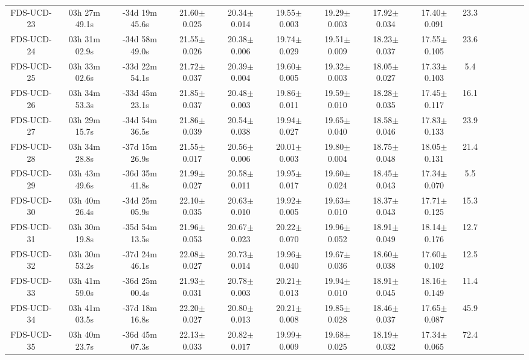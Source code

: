 \documentclass[fleqn,usenatbib]{mnras}
\begin{document}
\begin{table*}
\begin{tabular}{ ccccccccccccccc }
FDS-UCD-23 & 03h 27m 49.1s & -34d 19m 45.6s & 21.60$\pm$0.025 & 20.34$\pm$0.014 & 19.55$\pm$0.003 & 19.29$\pm$0.003 & 17.92$\pm$0.034 & 17.40$\pm$0.091 & 23.3 \\ 
FDS-UCD-24 & 03h 31m 02.9s & -34d 58m 49.0s & 21.55$\pm$0.026 & 20.38$\pm$0.006 & 19.74$\pm$0.029 & 19.51$\pm$0.009 & 18.23$\pm$0.037 & 17.55$\pm$0.105 & 23.6 \\ 
FDS-UCD-25 & 03h 33m 02.6s & -33d 22m 54.1s & 21.72$\pm$0.037 & 20.39$\pm$0.004 & 19.60$\pm$0.005 & 19.32$\pm$0.003 & 18.05$\pm$0.027 & 17.33$\pm$0.103 & 5.4 \\ 
FDS-UCD-26 & 03h 34m 53.3s & -33d 45m 23.1s & 21.85$\pm$0.037 & 20.48$\pm$0.003 & 19.86$\pm$0.011 & 19.59$\pm$0.010 & 18.28$\pm$0.035 & 17.45$\pm$0.117 & 16.1 \\ 
FDS-UCD-27 & 03h 29m 15.7s & -34d 54m 36.5s & 21.86$\pm$0.039 & 20.54$\pm$0.038 & 19.94$\pm$0.027 & 19.65$\pm$0.040 & 18.58$\pm$0.046 & 17.83$\pm$0.133 & 23.9 \\ 
FDS-UCD-28 & 03h 34m 28.8s & -37d 15m 26.9s & 21.55$\pm$0.017 & 20.56$\pm$0.006 & 20.01$\pm$0.003 & 19.80$\pm$0.004 & 18.75$\pm$0.048 & 18.05$\pm$0.131 & 21.4 \\ 
FDS-UCD-29 & 03h 43m 49.6s & -36d 35m 41.8s & 21.99$\pm$0.027 & 20.58$\pm$0.011 & 19.95$\pm$0.017 & 19.60$\pm$0.024 & 18.45$\pm$0.043 & 17.34$\pm$0.070 & 5.5 \\ 
FDS-UCD-30 & 03h 40m 26.4s & -34d 25m 05.9s & 22.10$\pm$0.035 & 20.63$\pm$0.010 & 19.92$\pm$0.005 & 19.63$\pm$0.010 & 18.37$\pm$0.043 & 17.71$\pm$0.125 & 15.3 \\ 
FDS-UCD-31 & 03h 30m 19.8s & -35d 54m 13.5s & 21.96$\pm$0.053 & 20.67$\pm$0.023 & 20.22$\pm$0.070 & 19.96$\pm$0.052 & 18.91$\pm$0.049 & 18.14$\pm$0.176 & 12.7 \\ 
FDS-UCD-32 & 03h 30m 53.2s & -37d 24m 46.1s & 22.08$\pm$0.027 & 20.73$\pm$0.014 & 19.96$\pm$0.040 & 19.67$\pm$0.036 & 18.60$\pm$0.038 & 17.60$\pm$0.102 & 12.5 \\ 
FDS-UCD-33 & 03h 41m 59.0s & -36d 25m 00.4s & 21.93$\pm$0.031 & 20.78$\pm$0.003 & 20.21$\pm$0.013 & 19.94$\pm$0.010 & 18.91$\pm$0.045 & 18.16$\pm$0.149 & 11.4 \\ 
FDS-UCD-34 & 03h 41m 03.5s & -37d 18m 16.8s & 22.20$\pm$0.027 & 20.80$\pm$0.013 & 20.21$\pm$0.008 & 19.85$\pm$0.028 & 18.46$\pm$0.037 & 17.65$\pm$0.087 & 45.9 \\ 
FDS-UCD-35 & 03h 40m 23.7s & -36d 45m 07.3s & 22.13$\pm$0.033 & 20.82$\pm$0.017 & 19.99$\pm$0.009 & 19.68$\pm$0.025 & 18.19$\pm$0.032 & 17.34$\pm$0.065 & 72.4 \\ 

\end{tabular}
\end{table*}
\end{document}
